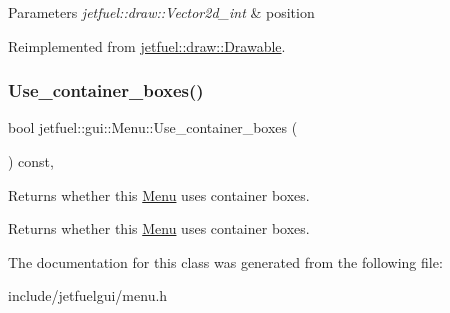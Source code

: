 \begin{DoxyParams}{Parameters}
{\em jetfuel\+::draw\+::\+Vector2d\+\_\+int} & position \\
\hline
\end{DoxyParams}


Reimplemented from \hyperlink{classjetfuel_1_1draw_1_1Drawable_afdd035afe40c706459a6c9df813bcce6}{jetfuel\+::draw\+::\+Drawable}.

\mbox{\label{classjetfuel_1_1gui_1_1Menu_ac30478425fc7feea544bad7f4dbad560}} 
\subsubsection{\texorpdfstring{Use\+\_\+container\+\_\+boxes()}{Use\_container\_boxes()}}
{\footnotesize\ttfamily bool jetfuel\+::gui\+::\+Menu\+::\+Use\+\_\+container\+\_\+boxes (\begin{DoxyParamCaption}{ }\end{DoxyParamCaption}) const\hspace{0.3cm}{\ttfamily [inline]}, {\ttfamily [protected]}}



Returns whether this \hyperlink{classjetfuel_1_1gui_1_1Menu}{Menu} uses container boxes. 

Returns whether this \hyperlink{classjetfuel_1_1gui_1_1Menu}{Menu} uses container boxes. 

The documentation for this class was generated from the following file\+:\begin{DoxyCompactItemize}
\item 
include/jetfuelgui/menu.\+h\end{DoxyCompactItemize}
